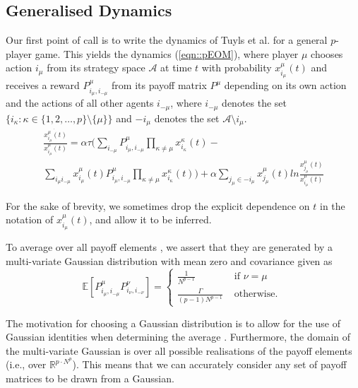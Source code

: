 \documentclass{article}
\newcommand{\xmu}[2]{x_{#1_#2}^{#2}(t)}
\newcommand{\payoff}[2]{P^{#2}_{#1_#2, #1_{-#2}}}
\begin{document}
\subsection{Generalised Dynamics}
\label{sec::gen_dyn}

Our first point of call is to write  the dynamics of Tuyls et al. for a general $p$-player
game. This yields the dynamics (\ref{eqn::pEOM}), where player $\mu$
chooses action $i_{\mu}$ from its strategy space $\mathcal{A}$ at time
$t$ with probability $\xmu{i}{\mu}$ and receives a reward
$\payoff{i}{\mu}$ from its payoff matrix $P^\mu$ depending on its own
action and the actions of all other agents $i_{-\mu}$, where $i_{-\mu}$ denotes the set $\{ i_\kappa : \kappa \in \{1, 2,
\ldots , p\} \setminus \{\mu\} \}$ and $-i_{\mu}$ denotes the set
$\mathcal{A} \setminus {i_\mu}$.
%
\begin{eqnarray}
\label{eqn::pEOM}
    \frac{\dot{\xmu{i}{\mu}}}{\xmu{i}{\mu}} = \alpha \tau \big( \sum_{i_{-\mu}} \payoff{i}{\mu} \prod_{\kappa \neq \mu} \xmu{i}{\kappa} - \\
    \sum_{i_\mu i_{-\mu}} \xmu{i}{\mu} \payoff{i}{\mu} \prod_{\kappa \neq \mu} \xmu{i}{\kappa} \big) + \alpha \sum_{j_\mu \in -i_\mu} \xmu{j}{\mu} ln \frac{\xmu{j}{\mu}}{\xmu{i}{\mu}}    \nonumber
\end{eqnarray}

For the sake of brevity, we sometimes drop the explicit dependence on $t$ in the notation of $\xmu{i}{\mu}$, and allow it to be inferred.

To average over all payoff elements , we assert that they
are generated by a multi-variate Gaussian distribution
with mean zero and covariance given as
%
\begin{equation}
\label{eqn::Payoffs}
        \mathbb{E}\left [ \payoff{i}{\mu} \payoff{i}{\nu} \right] = \begin{cases}
        \frac{1}{N^{p-1}} &  \text{ if } \nu = \mu \\
        \frac{\Gamma}{(p-1) N^{p-1}} & \text{ otherwise. }
        \end{cases}
\end{equation}

The motivation for choosing a
Gaussian distribution is to allow for the use of Gaussian identities when
determining the average \cite{Zinn-Justin:QFT}. Furthermore, the domain of the multi-variate Gaussian is over all possible realisations of the payoff elements (i.e., over $\mathbb{R}^{p \cdot N^p}$). This means that we can accurately consider any set of payoff matrices to be drawn from a Gaussian. 
\end{document}
